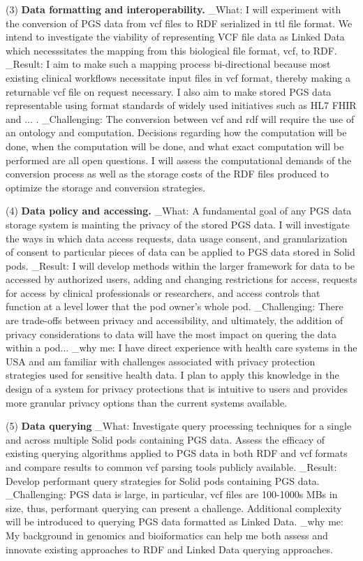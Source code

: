\documentclass[a4paper,11pt]{article}
\begin{document}
(3) \textbf{Data formatting and interoperability.} 
_What: I will experiment with the conversion of PGS data from vcf files to RDF serialized in ttl file format. 
We intend to investigate the viability of representing VCF file data as Linked Data which necesssitates the mapping from this biological file format, vcf, to RDF. 
_Result: I aim to make such a mapping process bi-directional because most existing clinical workflows necessitate input files in vcf format, thereby making a returnable vcf file on request necessary. 
I also aim to make stored PGS data representable using format standards of widely used initiatives such as HL7 FHIR and ... . 
_Challenging: The conversion between vcf and rdf will require the use of an ontology and computation. 
Decisions regarding how the computation will be done, when the computation will be done, and what exact computation will be performed are all open questions.
I will assess the computational demands of the conversion process as well as the storage costs of the RDF files produced to optimize the storage and conversion strategies.


(4) \textbf{Data policy and accessing.} 
_What: A fundamental goal of any PGS data storage system is mainting the privacy of the stored PGS data. 
I will investigate the ways in which data access requests, data usage consent, and granularization of consent to particular pieces of data can be applied to PGS data stored in Solid pods.
_Result: I will develop methods within the larger framework for data to be accessed by authorized users, adding and changing restrictions for access, requests for access by clinical professionals or researchers, and access controls that function at a level lower that the pod owner's whole pod.
_Challenging: There are trade-offs between privacy and accessibility, and ultimately, the addition of privacy considerations to data will have the most impact on quering the data within a pod...
_why me: I have direct experience with health care systems in the USA and am familiar with challenges associated with privacy protection strategies used for sensitive health data. 
I plan to apply this knowledge in the design of a system for privacy protections that is intuitive to users and provides more granular privacy options than the current systems available. 

(5) \textbf{Data querying}
_What: Investigate query processing techniques for a single and across multiple Solid pods containing PGS data. 
Assess the efficacy of existing querying algorithms applied to PGS data in both RDF and vcf formats and compare results to common vcf parsing tools publicly available.
_Result: Develop performant query strategies for Solid pods containing PGS data.
_Challenging: PGS data is large, in particular, vcf files are 100-1000s MBs in size, thus, performant querying can present a challenge. Additional complexity will be introduced to querying PGS data formatted as Linked Data.
_why me: My background in genomics and bioiformatics can help me both assess and innovate existing approaches to RDF and Linked Data querying approaches.
\end{document}
